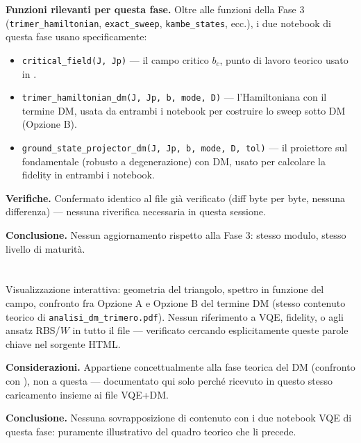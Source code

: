 \documentclass[11pt,a4paper]{article}
\begin{document}
\textbf{Funzioni rilevanti per questa fase.} Oltre alle funzioni della Fase 3
(\texttt{trimer\_hamiltonian}, \texttt{exact\_sweep}, \texttt{kambe\_states}, ecc.),
i due notebook di questa fase usano specificamente:
\begin{itemize}
\item \texttt{critical\_field(J,\ Jp)} — il campo critico $b_c$, punto di lavoro
teorico usato in \texttt{}.
\item \texttt{trimer\_hamiltonian\_dm(J,\ Jp,\ b,\ mode,\ D)} — l'Hamiltoniana con
il termine DM, usata da entrambi i notebook per costruire lo sweep sotto DM
(Opzione B).
\item \texttt{ground\_state\_projector\_dm(J,\ Jp,\ b,\ mode,\ D,\ tol)} — il
proiettore sul fondamentale (robusto a degenerazione) con DM, usato per calcolare
la fidelity in entrambi i notebook.
\end{itemize}

\textbf{Verifiche.} Confermato identico al file già verificato (diff byte per
byte, nessuna differenza) — nessuna riverifica necessaria in questa sessione.

\textbf{Conclusione.} Nessun aggiornamento rispetto alla Fase 3: stesso modulo,
stesso livello di maturità.

\section*{\texttt{}}

Visualizzazione interattiva: geometria del triangolo, spettro in funzione del
campo, confronto fra Opzione A e Opzione B del termine DM (stesso contenuto
teorico di \texttt{analisi\_dm\_trimero.pdf}). Nessun riferimento a VQE, fidelity, o
agli ansatz RBS/$W$ in tutto il file — verificato cercando esplicitamente queste
parole chiave nel sorgente HTML.

\textbf{Considerazioni.} Appartiene concettualmente alla fase teorica del DM
(confronto con \texttt{}), non a questa — documentato qui
solo perché ricevuto in questo stesso caricamento insieme ai file VQE+DM.

\textbf{Conclusione.} Nessuna sovrapposizione di contenuto con i due notebook VQE
di questa fase: puramente illustrativo del quadro teorico che li precede.

\section*{\texttt{}}
\end{document}
